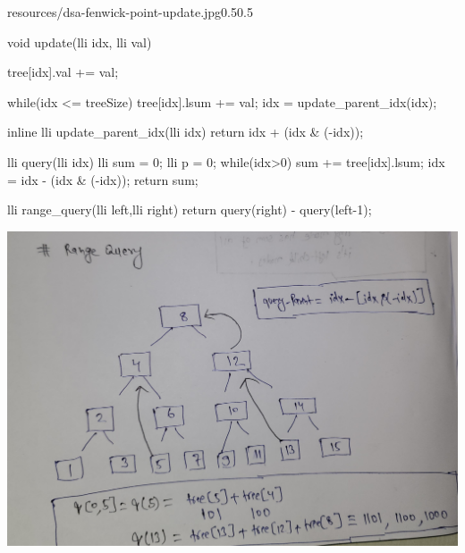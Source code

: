\begin{lfigure}{resources/dsa-fenwick-point-update.jpg}{0.5}{0.5}

    \begin{code3}
    void update(lli idx, lli val)
    {
        tree[idx].val += val;

        while(idx <= treeSize)
        {
            tree[idx].lsum += val;
            idx = update_parent_idx(idx);
        }
    }

  
    inline lli update_parent_idx(lli idx)
    {
        return  idx + (idx & (-idx));
    }
    \end{code3}

\end{lfigure}

\begin{fullwidth}
\begin{minipage}[c]{0.5\fullfigurelen}
    \begin{code3}
    lli query(lli idx)
    {
        lli sum = 0;
        lli p = 0;
        while(idx>0)
        {
            sum += tree[idx].lsum;
            idx = idx - (idx & (-idx));        
        } 
        return sum;
    }
    
    lli range_query(lli left,lli right)
    {
        return query(right) - query(left-1);
    }
    \end{code3}
\end{minipage}\hspace{10pt}
\begin{minipage}[c]{0.47\fullfigurelen}
    \includegraphics[width=\textwidth]{resources/dsa-fenwick-range-query.jpg}
\end{minipage}
\end{fullwidth}
